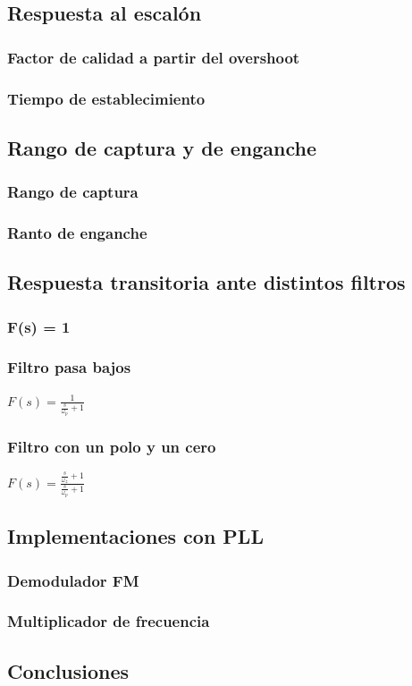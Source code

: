\subsection{Respuesta al escal\'on}

	\subsubsection{Factor de calidad a partir del overshoot}

	\subsubsection{Tiempo de establecimiento}

\subsection{Rango de captura y de enganche}

	\subsubsection{Rango de captura}

	\subsubsection{Ranto de enganche}

\subsection{Respuesta transitoria ante distintos filtros}

	\subsubsection{F(s) = 1}
		
	\subsubsection{Filtro pasa bajos}
	
	$F(s) = \frac{1}{\frac{s}{\omega_p} + 1}$
	
	\subsubsection{Filtro con un polo y un cero}
	$F(s) = \frac{\frac{s}{\omega_z} + 1}{\frac{s}{\omega_p} + 1}$

\subsection{Implementaciones con PLL}

	\subsubsection{Demodulador FM }
	
	\subsubsection{Multiplicador de frecuencia}

\subsection{Conclusiones}